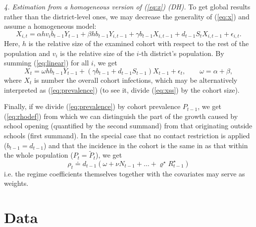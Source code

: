 \documentclass[fleqn,10pt]{wlscirep}
\begin{document}
{\em 4. Estimation from a homogeneous version of (\ref{eq:x}) (DH).} To get global results rather than the district-level ones, we may decrease the generality of (\ref{eq:x}) and assume a homogeneous model:
\begin{equation}
X_{i,t} = \alpha h v_i b_{t-1} Y_{t-1} + \beta h b_{t-1} Y_{i,t-1} + \gamma b_{t-1} X_{i,t-1}
+ d_{t-1} S_t X_{i,t-1} + \epsilon_{i,t}.
\label{eq:linear}
\end{equation}
Here, $h$ is the relative size of the examined cohort with respect to the rest of the population and $v_i$ is the relative size of the $i$-th district's population.
By summing (\ref{eq:linear}) for all $i$, we get 
\begin{equation}
X_{t} =  \omega h b_{t-1} Y_{t-1}
+ (\gamma b_{t-1} +  d_{t-1} S_{t-1})X_{t-1} + \epsilon_{t}, \qquad \omega = \alpha +\beta,
\label{eq:xss}
\end{equation}
where $X_t$ is number the overall cohort infections, which may be alternatively interpreted as (\ref{eq:prevalence})
(to see it, divide (\ref{eq:xss}) by the cohort size). 

Finally, if we divide (\ref{eq:prevalence}) by cohort prevalence $P_{t-1}$, we get (\ref{eq:rhodef})
from which we can distinguish the part of the growth caused by school opening (quantified by the second summand) from that originating outside schools (first summand). In the special case that no contact restriction is applied ($b_{t-1}=d_{t-1}$) and that the incidence in the cohort is the same in as that within the whole population ($P_t=\tilde P_t$), we get
\begin{equation}
\rho_t \doteq d_{t-1} (\omega + \nu N_{t-1} + \dots + \varrho^\star R^{\star}_{t-1})
\label{eq:rhoproc}
\end{equation}
i.e. the regime coefficients themselves together with the covariates may serve as weights.




\section{Data}
\label{sec:data}
\end{document}
